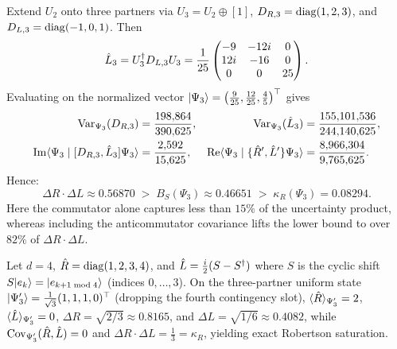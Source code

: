 \begin{example}
\label{ex:uncertainty-3x3}
Extend $U_2$ onto three partners via $U_3 = U_2 \oplus [1]$, $D_{R,3} = \diag(1, 2, 3)$,
and $D_{L,3} = \diag(-1, 0, 1)$. Then
\begin{equation*}
  \opL_3 = U_3^\dagger D_{L,3} U_3 =
  \frac{1}{25}\begin{pmatrix} -9 & -12i & 0 \\ 12i & -16 & 0 \\ 0 & 0 & 25 \end{pmatrix}.
\end{equation*}
Evaluating on the normalized vector $\ket{\Psi_3} = \bigl(\frac{9}{25}, \frac{12}{25}, \frac{4}{5}\bigr)^\top$ gives
\begin{align*}
  \var{D_{R,3}}{\Psi_3} &= \frac{198{,}864}{390{,}625}, &
  \var{\opL_3}{\Psi_3} &= \frac{155{,}101{,}536}{244{,}140{,}625}, \\
  \ImPart\braket{\Psi_3}{\comm{D_{R,3}}{\opL_3}\Psi_3} &= \frac{2{,}592}{15{,}625}, &
  \RePart\braket{\Psi_3}{\{\opR',\opL'\}\Psi_3} &= \frac{8{,}966{,}304}{9{,}765{,}625}.
\end{align*}
Hence:
\begin{equation*}
  \Delta R \cdot \Delta L \approx 0.56870
  \;>\; B_S(\Psi_3) \approx 0.46651
  \;>\; \kappa_R(\Psi_3) = 0.08294.
\end{equation*}
Here the commutator alone captures less than $15\%$ of the uncertainty product, whereas
including the anticommutator covariance lifts the lower bound to over $82\%$ of $\Delta R \cdot \Delta L$.
\end{example}

\begin{example}
\label{ex:uncertainty-4x4}
Let $d = 4$, $\opR = \diag(1, 2, 3, 4)$, and $\opL = \frac{i}{2}(S - S^\dagger)$ where $S$
is the cyclic shift $S\ket{e_k} = \ket{e_{k+1 \bmod 4}}$ (indices $0,\dots,3$). On the
three-partner uniform state $\ket{\Psi_3'} = \frac{1}{\sqrt{3}}(1, 1, 1, 0)^\top$
(dropping the fourth contingency slot), $\expect{\opR}{\Psi_3'} = 2$,
$\expect{\opL}{\Psi_3'} = 0$, $\Delta R = \sqrt{2/3} \approx 0.8165$, and
$\Delta L = \sqrt{1/6} \approx 0.4082$, while $\mathrm{Cov}_{\Psi_3'}(\opR,\opL) = 0$ and
$\Delta R \cdot \Delta L = \frac{1}{3} = \kappa_R$, yielding exact Robertson saturation.
\end{example}
